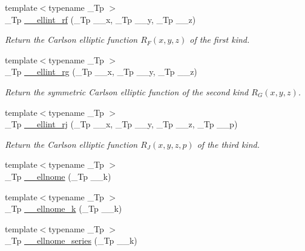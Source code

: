 \begin{DoxyCompactItemize}
{\footnotesize template$<$typename \+\_\+\+Tp $>$ }\\\+\_\+\+Tp \hyperlink{namespacestd_1_1____detail_a2cca271dcbdf22923219eab7a02450d5}{\+\_\+\+\_\+ellint\+\_\+rf} (\+\_\+\+Tp \+\_\+\+\_\+x, \+\_\+\+Tp \+\_\+\+\_\+y, \+\_\+\+Tp \+\_\+\+\_\+z)
\begin{DoxyCompactList}\small\item\em Return the Carlson elliptic function $ R_F(x,y,z) $ of the first kind. \end{DoxyCompactList}\item 
{\footnotesize template$<$typename \+\_\+\+Tp $>$ }\\\+\_\+\+Tp \hyperlink{namespacestd_1_1____detail_aaceff1eb320e0602afee36c60b80f87a}{\+\_\+\+\_\+ellint\+\_\+rg} (\+\_\+\+Tp \+\_\+\+\_\+x, \+\_\+\+Tp \+\_\+\+\_\+y, \+\_\+\+Tp \+\_\+\+\_\+z)
\begin{DoxyCompactList}\small\item\em Return the symmetric Carlson elliptic function of the second kind $ R_G(x,y,z) $. \end{DoxyCompactList}\item 
{\footnotesize template$<$typename \+\_\+\+Tp $>$ }\\\+\_\+\+Tp \hyperlink{namespacestd_1_1____detail_afe05ce66130b5f47389137c3f9aa6949}{\+\_\+\+\_\+ellint\+\_\+rj} (\+\_\+\+Tp \+\_\+\+\_\+x, \+\_\+\+Tp \+\_\+\+\_\+y, \+\_\+\+Tp \+\_\+\+\_\+z, \+\_\+\+Tp \+\_\+\+\_\+p)
\begin{DoxyCompactList}\small\item\em Return the Carlson elliptic function $ R_J(x,y,z,p) $ of the third kind. \end{DoxyCompactList}\item 
{\footnotesize template$<$typename \+\_\+\+Tp $>$ }\\\+\_\+\+Tp \hyperlink{namespacestd_1_1____detail_ac94c9cd28ee7973229e4a63d9b984711}{\+\_\+\+\_\+ellnome} (\+\_\+\+Tp \+\_\+\+\_\+k)
\item 
{\footnotesize template$<$typename \+\_\+\+Tp $>$ }\\\+\_\+\+Tp \hyperlink{namespacestd_1_1____detail_a7631f367a1be34f98cec2021d588457b}{\+\_\+\+\_\+ellnome\+\_\+k} (\+\_\+\+Tp \+\_\+\+\_\+k)
\item 
{\footnotesize template$<$typename \+\_\+\+Tp $>$ }\\\+\_\+\+Tp \hyperlink{namespacestd_1_1____detail_aec07b9131f90495831d349d22768425f}{\+\_\+\+\_\+ellnome\+\_\+series} (\+\_\+\+Tp \+\_\+\+\_\+k)
\item 

\end{DoxyCompactItemize}
